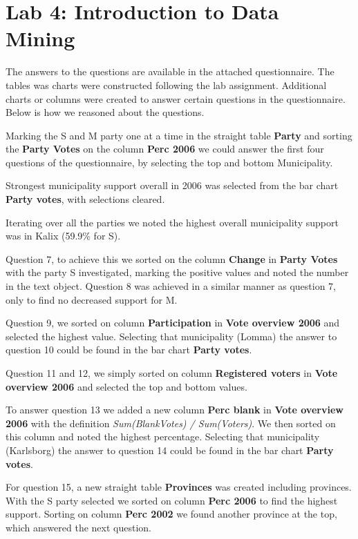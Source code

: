 \documentclass[a4paper]{article}
\begin{document}
\section{Lab 4: Introduction to Data Mining}
The answers to the questions are available in the attached questionnaire. The
tables was charts were constructed following the lab assignment. Additional
charts or columns were created to answer certain questions in the questionnaire.
Below is how we reasoned about the questions.

Marking the S and M party one at a time in the straight table \textbf{Party} and
sorting the \textbf{Party Votes} on the column \textbf{Perc 2006} we could
answer the first four questions of the questionnaire, by selecting the top and
bottom Municipality.

Strongest municipality support overall in 2006 was selected from the bar chart
\textbf{Party votes}, with selections cleared.

Iterating over all the parties we noted the highest overall municipality support
was in Kalix (59.9\% for S).

Question 7, to achieve this we sorted on the column \textbf{Change} in
\textbf{Party Votes} with the party S investigated, marking the positive values
and noted the number in the text object.  Question 8 was achieved in a similar
manner as question 7, only to find no decreased support for M.

Question 9, we sorted on column \textbf{Participation} in \textbf{Vote overview
2006} and selected the highest value. Selecting that municipality (Lomma) the
answer to question 10 could be found in the bar chart \textbf{Party votes}.

Question 11 and 12, we simply sorted on column \textbf{Registered voters} in
\textbf{Vote overview 2006} and selected the top and bottom values.

To answer question 13 we added a new column \textbf{Perc blank} in \textbf{Vote
overview 2006} with the definition \textit{Sum(BlankVotes) / Sum(Voters)}. We
then sorted on this column and noted the highest percentage. Selecting that
municipality (Karlsborg) the answer to question 14 could be found in the bar
chart \textbf{Party votes}.

For question 15, a new straight table \textbf{Provinces} was created including
provinces. With the S party selected we sorted on column \textbf{Perc 2006} to
find the highest support. Sorting on column \textbf{Perc 2002} we found another
province at the top, which answered the next question.
\end{document}

